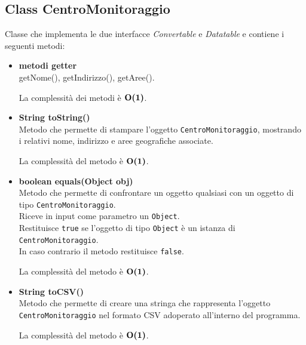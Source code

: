 \documentclass[a4paper, 12pt]{scrreprt}
\begin{document}
			\subsection{Class CentroMonitoraggio}
			Classe che implementa le due interfacce \textsl{Convertable} e \textsl{Datatable} e contiene i seguenti metodi:
			\begin{itemize}
				\item \textbf{metodi getter}
				\\getNome(), getIndirizzo(), getAree().

				La complessit\`a dei metodi \`e $\mathbf{O}\textbf{(1)}$.

				\item \textbf{String toString()}
				\\Metodo che permette di stampare l'oggetto \verb!CentroMonitoraggio!, mostrando i relativi nome, indirizzo e aree geografiche associate.

				La complessit\`a del metodo \`e $\mathbf{O}\textbf{(1)}$.

				\item \textbf{boolean equals(Object obj)}
				\\Metodo che permette di confrontare un oggetto qualsiasi con un oggetto di tipo \verb!CentroMonitoraggio!.
				\\Riceve in input come parametro un \verb!Object!.
				\\Restituisce \verb!true! se l'oggetto di tipo \verb!Object! \`e un istanza di \verb!CentroMonitoraggio!.
				\\In caso contrario il metodo restituisce \verb!false!.

				La complessit\`a del metodo \`e $\mathbf{O}\textbf{(1)}$.

				\item \textbf{String toCSV()}
				\\Metodo che permette di creare una stringa che rappresenta l'oggetto \verb!CentroMonitoraggio! nel formato CSV adoperato all'interno del programma.

				La complessit\`a del metodo \`e $\mathbf{O}\textbf{(1)}$.

			\end{itemize}
\pagebreak
\end{document}
